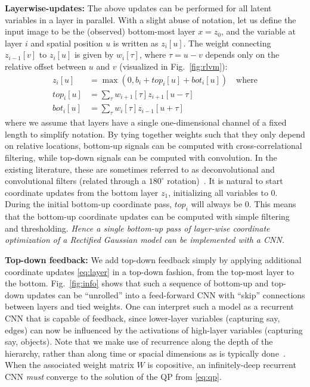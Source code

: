 \documentclass[10pt,twocolumn,letterpaper]{article}
\begin{document}
{\bf Layerwise-updates:} The above updates can be performed for all latent variables in a layer in parallel. With a slight abuse of
notation, let us define the input image to be the (observed) bottom-most
layer $x=z_0$, and the variable at layer $i$ and spatial position $u$
is written as $z_i[u]$. The weight connecting $z_{i-1}[v]$ to
$z_{i}[u]$ is given by $w_i[\tau]$, where $\tau = u - v$ depends only
on the relative offset between $u$ and $v$ (visualized in
Fig.~\ref{fig:rlvm}):
\begin{align}
  z_i[u] &= \max(0, b_i + top_i[u] + bot_i[u]) \label{eq:layer} \quad \text{where}\\
  top_i[u] &= \sum_{\tau} w_{i+1}[\tau] z_{i+1} [u-\tau] \nonumber\\
  bot_i[u] &= \sum_{\tau} w_{i}[\tau] z_{i-1}[u+\tau] \nonumber
\end{align}
\noindent where we assume that layers have a single one-dimensional
channel of a fixed length to simplify notation. By tying together
weights such that they only depend on relative locations, bottom-up
signals can be computed with cross-correlational filtering, while
top-down signals can be computed with convolution. In the existing
literature, these are sometimes referred to as deconvolutional and
convolutional filters (related through a $180^\circ$
rotation)~\cite{zeiler2010deconvolutional}. It is natural to start
coordinate updates from the bottom layer $z_1$, initializing all
variables to 0. During the initial bottom-up coordinate pass, $top_i$
will always be 0. This means that the bottom-up coordinate updates can
be computed with simple filtering and thresholding. {\em Hence a
  single bottom-up pass of layer-wise coordinate optimization of a
  Rectified Gaussian model can be implemented with a CNN.}

{\bf Top-down feedback:} We add top-down feedback simply by applying
additional coordinate updates \eqref{eq:layer} in a top-down fashion,
from the top-most layer to the bottom. Fig.~\ref{fig:info} shows that
such a sequence of bottom-up and top-down updates can be ``unrolled''
into a feed-forward CNN with ``skip'' connections between layers and
tied weights. One can interpret such a model as a recurrent CNN that
is capable of feedback, since lower-layer variables (capturing say,
edges) can now be influenced by the activations of high-layer
variables (capturing say, objects).  Note that we make use of
recurrence along the depth of the hierarchy, rather than along time or
spacial dimensions as is typically done~\cite{haykin2009neural}. When
the associated weight matrix $W$ is copositive, an infinitely-deep
recurrent CNN {\em must} converge to the solution of the QP from
\eqref{eq:qp}.
\end{document}
